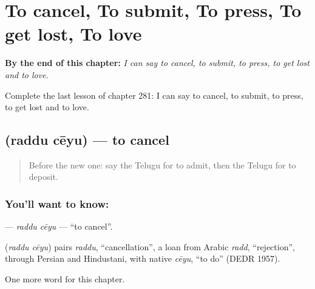 
\chapter{To cancel, To submit, To press, To get lost, To love}
\label{ch:te-to-cancel-to-submit-to-press-to-get-lost-to-love}

\begin{chapteropening}
\textbf{By the end of this chapter:} \emph{I can say to cancel, to submit, to press, to get lost and to love.}

Complete the last lesson of chapter 281: I can say to cancel, to submit, to press, to get lost and to love.
\end{chapteropening}

\section[\texorpdfstring{\te{రద్దు} \te{చేయు} (raddu cēyu)}{రద్దు చేయు (raddu cēyu)}]{  (raddu cēyu) — to cancel}

\label{lesson:TE-C281-raddu-ceyu}



\begin{quote}
Before the new one: say the Telugu for to admit, then the Telugu for to deposit.
\end{quote}

\subsection*{You'll want to know:  }
\textbf{ } — \emph{raddu cēyu} — \textquotedblleft{}to cancel\textquotedblright{}.

\begin{cousinweb}
\textbf{ } (\emph{raddu cēyu}) pairs \emph{raddu}, \textquotedblleft{}cancellation\textquotedblright{}, a loan from Arabic \emph{radd}, \textquotedblleft{}rejection\textquotedblright{}, through Persian and Hindustani, with native \emph{cēyu}, \textquotedblleft{}to do\textquotedblright{} (DEDR 1957).
\end{cousinweb}

\begin{grammarlens}[title={What you've built}]
One more word for this chapter.
\end{grammarlens}

